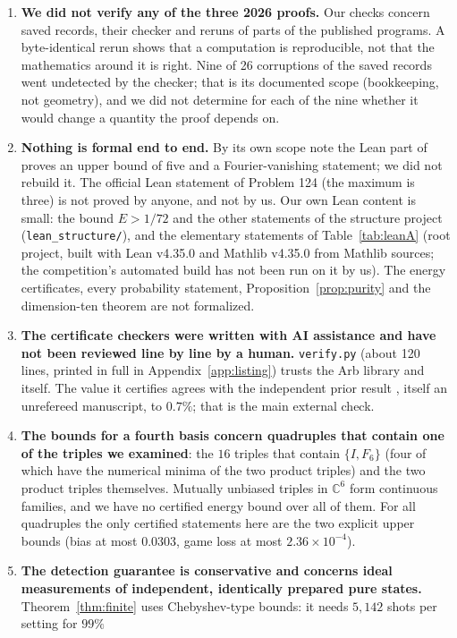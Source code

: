 \documentclass[11pt]{article}
\newcommand{\C}{\mathbb{C}}
\newcommand{\E}{E}                       %
\theoremstyle{definition}
\theoremstyle{remark}
\begin{document}
\begin{enumerate}[leftmargin=1.6em]
\item \textbf{We did not verify any of the three 2026 proofs.} Our checks concern saved records, their checker
and reruns of parts of the published programs. A byte-identical rerun shows that a computation is reproducible,
not that the mathematics around it is right. Nine of 26 corruptions of the saved records went undetected by the
checker; that is its documented scope (bookkeeping, not geometry), and we did not determine for each of the nine
whether it would change a quantity the proof depends on.
\item \textbf{Nothing is formal end to end.} By its own scope note the Lean part of \cite{OAI} proves an upper
bound of five and a Fourier-vanishing statement; we did not rebuild it. The official Lean statement of Problem 124
(the maximum is three) is not proved by anyone, and not by us. Our own Lean content is small: the bound $\E>1/72$ and the other statements of the structure project
(\texttt{lean\_structure/}), and the elementary statements of Table~\ref{tab:leanA} (root project, built with
Lean v4.35.0 and Mathlib v4.35.0 from Mathlib sources; the competition's automated build has not been run on it by
us). The energy certificates, every probability statement, Proposition~\ref{prop:purity} and the dimension-ten
theorem are not formalized.
\item \textbf{The certificate checkers were written with AI assistance and have not been reviewed line by line by
a human.} \texttt{verify.py} (about 120 lines, printed in full in Appendix~\ref{app:listing}) trusts the Arb library and itself. The value it certifies agrees with the
independent prior result \cite{Erlwein}, itself an unrefereed manuscript, to $0.7\%$; that is the main external check.
\item \textbf{The bounds for a fourth basis concern quadruples that contain one of the triples we examined}: the
$16$ triples that contain $\{I,F_6\}$ (four of which have the numerical minima of the two product triples) and
the two product triples themselves. Mutually unbiased triples in $\C^6$
form continuous families, and we have no certified energy bound over all of them. For all quadruples the only
certified statements here are the two explicit upper bounds (bias at most $0.0303$, game loss at most $2.36\times10^{-4}$).
\item \textbf{The detection guarantee is conservative and concerns ideal measurements of independent, identically
prepared pure states.} Theorem~\ref{thm:finite} uses Chebyshev-type bounds: it needs $5{,}142$ shots per setting for $99\%$

\end{enumerate}
\end{document}
